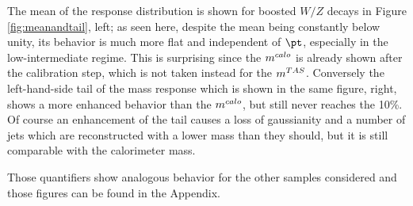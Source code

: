The mean of the response distribution is shown for boosted $W/Z$ decays in Figure \ref{fig:meanandtail}, left; as seen here, despite the mean being constantly below unity, its behavior is much more flat and independent of $\pt$, especially in the low-intermediate regime. This is surprising since the $m^{calo}$ is already shown after the calibration step, which is not taken instead for the $m^{TAS}$. Conversely the left-hand-side tail of the mass response which is shown in the same figure, right, shows a more enhanced behavior than the $m^{calo}$, but still never reaches the 10\%. Of course an enhancement of the tail causes a loss of gaussianity and a number of jets which are reconstructed with a lower mass than they should, but it is still comparable with the calorimeter mass.

Those quantifiers show analogous behavior for the other samples considered and those figures can be found in the Appendix.


